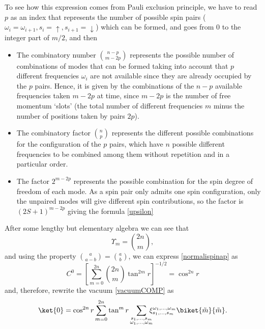 To see how this expression comes from Pauli exclusion principle, we have to read $p$ as an index that represents the number of possible spin pairs ($\omega_i=\omega_{i+1},s_i=\uparrow,s_{i+1}=\downarrow$) which can be formed, and goes from $0$ to the integer part of $m/2$, and then
\begin{itemize}
\item The combinatory number $\binom{n-p}{m-2p}$ represents the possible number of combinations of modes that can be formed taking into account that $p$ different frequencies $\omega_i$ are not available since they are already occupied by the $p$ pairs. Hence, it is given by the combinations of the $n-p$ available frequencies taken $m-2p$ at time, since $m-2p$ is the number of free momentum `slots' (the total number of different frequencies $m$ minus the number of positions taken by pairs $2p$).
\item The combinatory factor $\binom{n}{p}$ represents the different possible combinations for the configuration of the $p$ pairs, which have $n$ possible different frequencies to be combined among them without repetition and in a particular order.
\item The factor $2^{m-2p}$ represents the possible combination for the spin degree of freedom of each mode. As a spin pair only admits one spin configuration, only the unpaired modes will give different spin contributions, so the factor is $(2S+1)^{m-2p}$ giving the formula \eqref{upsilon}
\end{itemize}

After some lengthy but elementary algebra we can see that
\begin{equation}\label{upsilon22}\Upsilon_m=\binom{2n}{m},
\end{equation}
and using the property $\binom{a}{a-b}=\binom{a}{b}$, 
we can express \eqref{normalispinap} as
\begin{equation}\label{normalispin}
C^0=\left[\sum_{m=0}^{2n}\binom{2n}{m}\tan^{2m}r\right]^{-1/2}=\cos^{2n}r 
\end{equation}
and, therefore, rewrite the vacuum \eqref{vacuumCOMP} as
\begin{equation}\label{vacuumCOMP2b}
\ket{0}=\cos^{2n}r\sum_{m=0}^{2n}\tan^m r\sum_{\substack{s_1,\dots,s_m\\\omega_1,\dots,\omega_m}}\!\!\!\!\xi_{s_1,\dots,s_m}^{\omega_1,\dots,\omega_m} \biket{\tilde m}{\tilde m}.\\
\end{equation}

